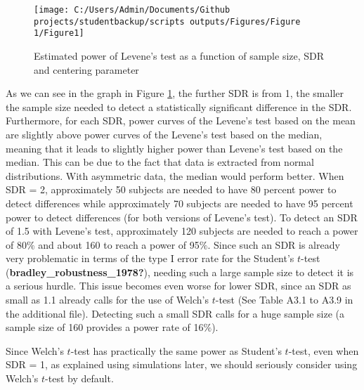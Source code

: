 \documentclass[
  english,
  man]{apa6}
\begin{document}
\begin{figure}

{\centering \texttt{[image: C:/Users/Admin/Documents/Github projects/studentbackup/scripts outputs/Figures/Figure 1/Figure1]} 

}

\caption{Estimated power of Levene's test as a function of sample size, SDR and centering parameter}\label{fig:chp2fig1}
\end{figure}

As we can see in the graph in Figure \ref{fig:chp2fig1}, the further SDR is from 1, the smaller the sample size needed to detect a statistically significant difference in the SDR. Furthermore, for each SDR, power curves of the Levene's test based on the mean are slightly above power curves of the Levene's test based on the median, meaning that it leads to slightly higher power than Levene's test based on the median. This can be due to the fact that data is extracted from normal distributions. With asymmetric data, the median would perform better. When SDR = 2, approximately 50 subjects are needed to have 80 percent power to detect differences while approximately 70 subjects are needed to have 95 percent power to detect differences (for both versions of Levene's test). To detect an SDR of 1.5 with Levene's test, approximately 120 subjects are needed to reach a power of 80\(\%\) and about 160 to reach a power of 95\(\%\). Since such an SDR is already very problematic in terms of the type I error rate for the Student's \(t\)-test (\textbf{bradley\_robustness\_1978?}), needing such a large sample size to detect it is a serious hurdle. This issue becomes even worse for lower SDR, since an SDR as small as 1.1 already calls for the use of Welch's \(t\)-test (See Table A3.1 to A3.9 in the additional file). Detecting such a small SDR calls for a huge sample size (a sample size of 160 provides a power rate of 16\(\%\)).

Since Welch's \(t\)-test has practically the same power as Student's \(t\)-test, even when SDR = 1, as explained using simulations later, we should seriously consider using Welch's \(t\)-test by default.
\end{document}
